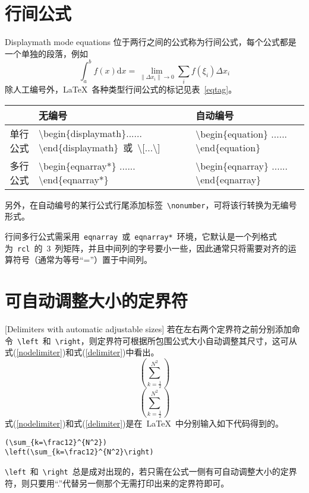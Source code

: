 \section{行间公式}{Displaymath mode equations}
位于两行之间的公式称为行间公式，每个公式都是一个单独的段落，例如
\[\int_a^b{f\left(x\right)\mathrm{d}x}=\lim_{\left\|\Delta{x_i}\right\|\to 0}\sum_i{f\left(\xi_i\right)\Delta{x_i}}\]
除人工编号外，\LaTeX~各种类型行间公式的标记见表~\ref{eqtag}。
\begin{table}[htbp]
\vspace{0.5em}\centering\wuhao
\begin{tabularx}{0.9\textwidth}{cXX}
\toprule
& 无编号 & 自动编号\\\midrule
单行公式 & \textbackslash begin\{displaymath\}...... \textbackslash end\{displaymath\}~或~\textbackslash [...\textbackslash ] & \textbackslash begin\{equation\} ...... \textbackslash end\{equation\}\\
多行公式 & \textbackslash begin\{eqnarray*\} ...... \textbackslash end\{eqnarray*\} & \textbackslash begin\{eqnarray\} ...... \textbackslash end\{eqnarray\}\\
\bottomrule
\end{tabularx}
\end{table}
另外，在自动编号的某行公式行尾添加标签~\verb|\nonumber|，可将该行转换为无编号形式。

行间多行公式需采用~\verb|eqnarray|~或~\verb|eqnarray*|~环境，它默认是一个列格式为~\verb|rcl|~的~3~列矩阵，并且中间列的字号要小一些，因此通常只将需要对齐的运算符号（通常为等号“=”）置于中间列。

\section{可自动调整大小的定界符}[Delimiters with automatic adjustable sizes]
若在左右两个定界符之前分别添加命令~\verb|\left|~和~\verb|\right|，则定界符可根据所包围公式大小自动调整其尺寸，这可从式(\ref{nodelimiter})和式(\ref{delimiter})中看出。
\begin{equation}\label{nodelimiter}
(\sum_{k=\frac12}^{N^2})
\end{equation}
\begin{equation}\label{delimiter}
\left(\sum_{k=\frac12}^{N^2}\right)
\end{equation}
式(\ref{nodelimiter})和式(\ref{delimiter})是在~\LaTeX~中分别输入如下代码得到的。
\begin{lstlisting}
(\sum_{k=\frac12}^{N^2})
\left(\sum_{k=\frac12}^{N^2}\right)
\end{lstlisting}
\verb|\left|~和~\verb|\right|~总是成对出现的，若只需在公式一侧有可自动调整大小的定界符，则只要用“.”代替另一侧那个无需打印出来的定界符即可。

